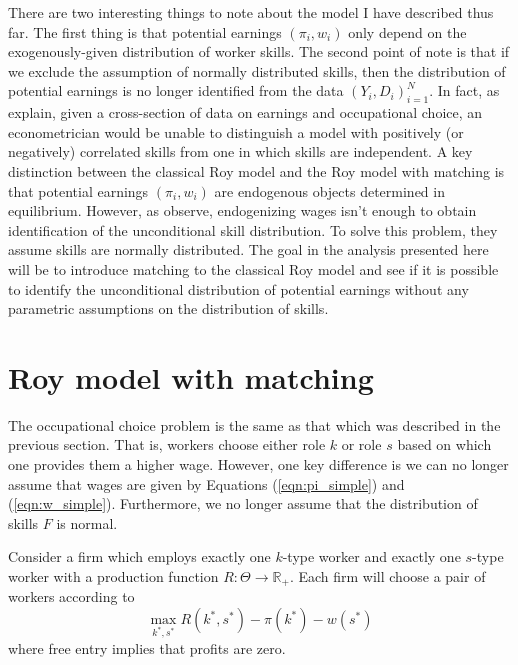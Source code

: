 \documentclass[12 pt]{article}
\begin{document}
There are two interesting things to note about the model I have described thus far. The first thing is that potential earnings $(\pi_i,w_i)$ only depend on the exogenously-given distribution of worker skills. The second point of note is that if we exclude the assumption of normally distributed skills, then the distribution of potential earnings is no longer identified from the data $(Y_i,D_i)_{i=1}^N$. In fact, as \citet{heckman1990empirical} explain, given a cross-section of data on earnings and occupational choice, an econometrician would be unable to distinguish a model with positively (or negatively) correlated skills from one in which skills are independent. A key distinction between the classical Roy model and the Roy model with matching is that potential earnings $(\pi_i,w_i)$ are endogenous objects determined in equilibrium. However, as \citet{heckman1985heterogeneity} observe, endogenizing wages isn't enough to obtain identification of the unconditional skill distribution. To solve this problem, they assume skills are normally distributed. The goal in the analysis presented here will be to introduce matching to the classical Roy model and see if it is possible to identify the unconditional distribution of potential earnings without any parametric assumptions on the distribution of skills.

\section{Roy model with matching}

The occupational choice problem is the same as that which was described in the previous section. That is, workers choose either role $k$ or role $s$ based on which one provides them a higher wage. However, one key difference is we can no longer assume that wages are given by Equations (\ref{eqn:pi_simple}) and (\ref{eqn:w_simple}). Furthermore, we no longer assume that the distribution of skills $F$ is normal.

Consider a firm which employs exactly one $k$-type worker and exactly one $s$-type worker with a production function $R:\Theta \to \mathbb{R}_+$. Each firm will choose a pair of workers according to
\begin{equation}
	\max_{k^*,s^*} R(k^*,s^*) - \pi(k^*) - w(s^*)
	\label{eqn:firm_prob}
\end{equation}
where free entry implies that profits are zero.
\end{document}
